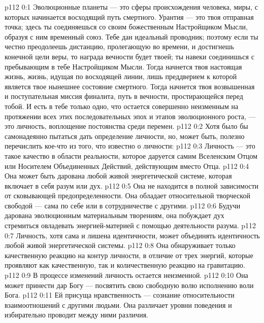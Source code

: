 \author{Одиночный Вестник}
\vs p112 0:1 Эволюционные планеты --- это сферы происхождения человека, миры, с которых начинается восходящий путь смертного. Урантия --- это твоя отправная точка; здесь ты соединяешься со своим божественным Настройщиком Мысли, образуя с ним временный союз. Тебе дан идеальный проводник; поэтому если ты честно преодолеешь дистанцию, пролегающую во времени, и достигнешь конечной цели веры, то награда вечности будет твоей; ты навеки соединишься с пребывающим в тебе Настройщиком Мысли. Тогда начнется твоя настоящая жизнь, жизнь, идущая по восходящей линии, лишь преддверием к которой является твое нынешнее состояние смертного. Тогда начнется твоя возвышенная и поступательная миссия финалита, путь в вечности, простирающейся перед тобой. И есть в тебе только одно, что остается совершенно неизменным на протяжении всех этих последовательных эпох и этапов эволюционного роста, --- это личность, воплощение постоянства среди перемен.
\vs p112 0:2 \pc Хотя было бы самонадеянно пытаться дать определение личности, но, может быть, полезно перечислить кое\hyp{}что из того, что известно о личности:
\vs p112 0:3 \bibnobreakspace Личность --- это такое качество в области реальности, которое даруется самим Вселенским Отцом или Носителем Объединенных Действий, действующим вместо Отца.
\vs p112 0:4 \bibnobreakspace Она может быть дарована любой живой энергетической системе, которая включает в себя разум или дух.
\vs p112 0:5 \bibnobreakspace Она не находится в полной зависимости от сковывающей предопределенности. Она обладает относительной творческой свободой --- сама по себе или в сотрудничестве с другими.
\vs p112 0:6 \bibnobreakspace Будучи дарована эволюционным материальным творениям, она побуждает дух стремиться овладевать энергией\hyp{}материей с помощью деятельности разума.
\vs p112 0:7 \bibnobreakspace Личность, хотя сама и лишена идентичности, может объединять идентичность любой живой энергетической системы.
\vs p112 0:8 \bibnobreakspace Она обнаруживает только качественную реакцию на контур личности, в отличие от трех энергий, которые проявляют как качественную, так и количественную реакцию на гравитацию.
\vs p112 0:9 \bibnobreakspace В процессе изменений личность остается неизменной.
\vs p112 0:10 \bibnobreakspace Она может принести дар Богу --- посвятить свою свободную волю исполнению воли Бога.
\vs p112 0:11 \bibnobreakspace Ей присуща нравственность --- сознание относительности взаимоотношений с другими людьми. Она различает уровни поведения и избирательно проводит между ними различия.
